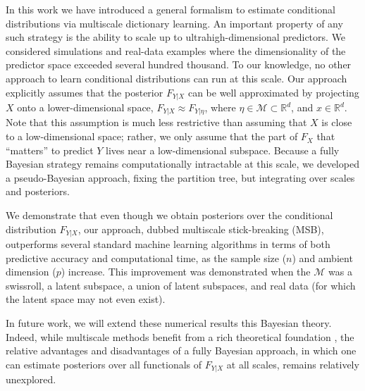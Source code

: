 \documentclass{article} %
\newcommand{\Real}{\mathbb{R}}
\providecommand{\mc}[1]{\mathcal{#1}}
\newcommand{\dd}[1]{{\color{blue}{\it #1}}}
\begin{document}
In this work we have introduced a general formalism to estimate conditional distributions via  multiscale dictionary learning.  An important property of any such strategy is the ability to scale up to ultrahigh-dimensional predictors.  We considered simulations and real-data examples where the dimensionality of the predictor space exceeded several hundred thousand.  To our knowledge, no other approach to learn conditional distributions can run at this scale.  Our approach explicitly assumes that the posterior $F_{Y|X}$ can be well approximated by projecting $X$ onto a lower-dimensional space, $F_{Y|X} \approx F_{Y|\eta}$, where $\eta \in \mc{M} \subset \Real^d$, and $x \in \Real^d$.   Note that this assumption is much less restrictive than assuming that $X$ is close to a low-dimensional space; rather, we only assume that the part of $F_X$ that ``matters'' to predict $Y$ lives near a low-dimensional subspace.  Because a fully Bayesian strategy remains computationally intractable at this scale, we developed a pseudo-Bayesian approach, fixing the partition tree, but integrating over scales and posteriors.

We demonstrate that even though we obtain posteriors over the conditional distribution $F_{Y|X}$, our approach, dubbed multiscale stick-breaking (MSB), outperforms several standard machine learning algorithms in terms of both predictive accuracy and computational time, as the sample size ($n$) and ambient dimension ($p$) increase.  This improvement was demonstrated when the $\mc{M}$ was a swissroll, a latent subspace, a union of latent subspaces, and real data (for which the latent space may not even exist).    

In future work, we will extend these numerical results this Bayesian theory.  Indeed, while multiscale methods benefit from a rich theoretical foundation \cite{Allard2012}, the relative advantages and disadvantages of a fully Bayesian approach, in which one can estimate posteriors over all functionals of $F_{Y|X}$ at all scales, remains relatively unexplored.  

\dd{we gotta remove about 10 references to make our reference list fit} 

 
 
\end{document}
